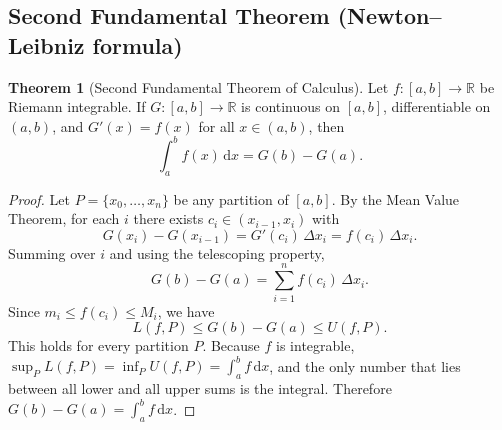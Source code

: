 \documentclass[12pt,a4paper]{book}
\theoremstyle{definition}
\newtheorem{theorem}{Theorem}[chapter]
\newcommand{\R}{\mathbb{R}}
\newcommand{\dd}{\,\mathrm{d}}
\begin{document}
\begin{center}
\end{center}


\subsection{Second Fundamental Theorem (Newton--Leibniz formula)}\label{subsec:FTC2}

\begin{theorem}[Second Fundamental Theorem of Calculus]\label{thm:FTC2}
  Let $f\colon[a,b]\to\R$ be Riemann integrable.  If $G\colon[a,b]\to\R$
  is continuous on $[a,b]$, differentiable on $(a,b)$, and $G'(x)=f(x)$
  for all $x\in(a,b)$, then
  \[
    \int_a^b f(x)\dd x = G(b)-G(a).
  \]
\end{theorem}

\begin{proof}
  Let $P=\{x_0,\ldots,x_n\}$ be any partition of $[a,b]$.  By the Mean
  Value Theorem, for each $i$ there exists $c_i\in(x_{i-1},x_i)$ with
  \[
    G(x_i)-G(x_{i-1}) = G'(c_i)\,\Delta x_i = f(c_i)\,\Delta x_i.
  \]
  Summing over $i$ and using the telescoping property,
  \[
    G(b)-G(a) = \sum_{i=1}^n f(c_i)\,\Delta x_i.
  \]
  Since $m_i\le f(c_i)\le M_i$, we have
  \[
    L(f,P) \le G(b)-G(a) \le U(f,P).
  \]
  This holds for every partition $P$.  Because $f$ is integrable,
  $\sup_P L(f,P)=\inf_P U(f,P)=\int_a^b f\dd x$, and the only number
  that lies between all lower and all upper sums is the integral.
  Therefore $G(b)-G(a)=\int_a^b f\dd x$.
\end{proof}
\end{document}
